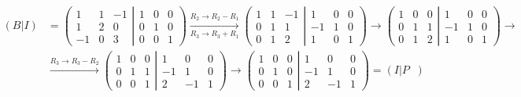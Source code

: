 \documentclass{article}
\DeclareMathOperator{\tra}{^t}
\begin{document}
\begin{align*}
    (B | I) & = \left(
    \begin{matrix}
            1  & 1 & -1 \\
            1  & 2 & 0  \\
            -1 & 0 & 3
        \end{matrix}
    \left|
    \begin{matrix}
            1 & 0 & 0 \\
            0 & 1 & 0 \\
            0 & 0 & 1
        \end{matrix}
    \right.
    \right)
    \xrightarrow[R_3\rightarrow R_3+R_1]{R_2\rightarrow R_2-R_1}
    \left(
    \begin{matrix}
            1 & 1 & -1 \\
            0 & 1 & 1  \\
            0 & 1 & 2
        \end{matrix}
    \left|
    \begin{matrix}
            1  & 0 & 0 \\
            -1 & 1 & 0 \\
            1  & 0 & 1
        \end{matrix}
    \right.
    \right)
    \rightarrow
    \left(
    \begin{matrix}
            1 & 0 & 0 \\
            0 & 1 & 1 \\
            0 & 1 & 2
        \end{matrix}
    \left|
    \begin{matrix}
            1  & 0 & 0 \\
            -1 & 1 & 0 \\
            1  & 0 & 1
        \end{matrix}
    \right.
    \right)
    \rightarrow                                      \\
            & \xrightarrow[]{R_3\rightarrow R_3-R_2}
    \left(
    \begin{matrix}
            1 & 0 & 0 \\
            0 & 1 & 1 \\
            0 & 0 & 1
        \end{matrix}
    \left|
    \begin{matrix}
            1  & 0  & 0 \\
            -1 & 1  & 0 \\
            2  & -1 & 1
        \end{matrix}
    \right.
    \right)
    \rightarrow
    \left(
    \begin{matrix}
            1 & 0 & 0 \\
            0 & 1 & 0 \\
            0 & 0 & 1
        \end{matrix}
    \left|
    \begin{matrix}
            1  & 0  & 0 \\
            -1 & 1  & 0 \\
            2  & -1 & 1
        \end{matrix}
    \right.
    \right)=(I | P\tra)
\end{align*}
\end{document}
